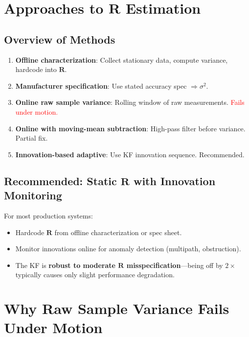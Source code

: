 \documentclass[11pt,a4paper]{article}
\begin{document}
\section{Approaches to $\mathbf{R}$ Estimation}

\subsection{Overview of Methods}

\begin{enumerate}
    \item \textbf{Offline characterization}: Collect stationary data, compute variance, hardcode into $\mathbf{R}$.
    \item \textbf{Manufacturer specification}: Use stated accuracy spec $\Rightarrow \sigma^2$.
    \item \textbf{Online raw sample variance}: Rolling window of raw measurements. \textcolor{red}{Fails under motion.}
    \item \textbf{Online with moving-mean subtraction}: High-pass filter before variance. Partial fix.
    \item \textbf{Innovation-based adaptive}: Use KF innovation sequence. \textcolor{green!50!black}{Recommended.}
\end{enumerate}

\subsection{Recommended: Static $\mathbf{R}$ with Innovation Monitoring}

For most production systems:
\begin{itemize}
    \item Hardcode $\mathbf{R}$ from offline characterization or spec sheet.
    \item Monitor innovations online for anomaly detection (multipath, obstruction).
    \item The KF is \textbf{robust to moderate $\mathbf{R}$ misspecification}---being off by $2\times$ typically causes only slight performance degradation.
\end{itemize}

\section{Why Raw Sample Variance Fails Under Motion}
\end{document}
